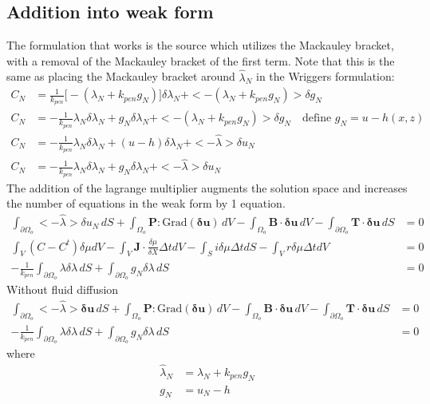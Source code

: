 \documentclass[12pt,3p]{article}
\begin{document}
\subsection{Addition into weak form}
The formulation that works is the source which utilizes the Mackauley bracket, with a removal of the Mackauley bracket of the first term. Note that this is the same as placing the Mackauley bracket around $\hat{\lambda}_N$ in the Wriggers formulation: 
\begin{align*}
C_N &= \frac{1}{k_{pen}} \big[- (\lambda_N + k_{pen} g_N) \big] \delta \lambda_N + <-(\lambda_N + k_{pen} g_N) > \delta g_N \\
C_N &= - \frac{1}{k_{pen}} \lambda_N \delta \lambda_N + g_N \delta \lambda_N + <-(\lambda_N + k_{pen} g_N) > \delta g_N \quad \text{define } g_N = u - h(x, z) \\
C_N &= - \frac{1}{k_{pen}} \lambda_N \delta \lambda_N + ( u - h ) \delta \lambda_N + < - \hat{\lambda} > \delta u_N \\
C_N &= - \frac{1}{k_{pen}} \lambda_N \delta \lambda_N + g_N \delta \lambda_N + < - \hat{\lambda} > \delta u_N 
\end{align*}
The addition of the lagrange multiplier augments the solution space and increases the number of equations in the weak form by 1 equation. 
\begin{align*}
 \int_{\partial \Omega_o} < - \hat{\lambda} > \delta u_N \, dS +\int_{\Omega_o} \mathbf{P} : \text{Grad}(\pmb{\delta} \mathbf{u} ) \, dV - \int_{\Omega_o} \mathbf{B} \cdot \pmb{\delta} \mathbf{u} \, dV - \int_{\partial \Omega_o} \mathbf{T} \cdot \pmb{\delta} \mathbf{u} \, dS  &= 0 \\\int_{V}\left(C-C^{t}\right) \delta \mu d V-\int_{V} \mathbf{J} \cdot \frac{\delta \mu}{\delta X} \Delta t d V-\int_{S} i \delta \mu \Delta t d S-\int_{V} r \delta \mu \Delta t d V &=0 \\
- \frac{1}{k_{pen}} \int_{\partial \Omega_o} \lambda \delta \lambda \, dS +  \int_{\partial \Omega_o}  g_N \delta \lambda \, dS &= 0 
\end{align*}
Without fluid diffusion
\begin{align*}
 \int_{\partial \Omega_o} < - \hat{\lambda} > \pmb{\delta} \mathbf{u} \, dS +\int_{\Omega_o} \mathbf{P} : \text{Grad}(\pmb{\delta} \mathbf{u} ) \, dV - \int_{\Omega_o} \mathbf{B} \cdot \pmb{\delta} \mathbf{u} \, dV - \int_{\partial \Omega_o} \mathbf{T} \cdot \pmb{\delta} \mathbf{u} \, dS  &= 0 \\
- \frac{1}{k_{pen}} \int_{\partial \Omega_o} \lambda \delta \lambda \, dS +  \int_{\partial \Omega_o}  g_N \delta \lambda \, dS &= 0 
\end{align*}
where 
\begin{align*}
\hat{\lambda}_N &= \lambda_N + k_{pen} g_N \\
g_N &= u_N - h
\end{align*}
\end{document}
